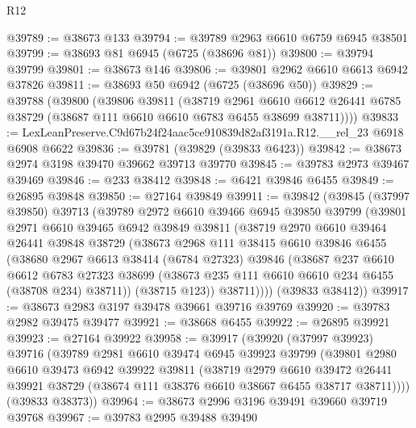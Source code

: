 \begin{lexlean}{R12}
\begin{coremodule}
@39789 := @38673 @133
@39794 := @39789 @2963 @6610 @6759 @6945 @38501
@39799 := @38693 @81 @6945 (@6725 (@38696 @81))
@39800 := @39794 @39799
@39801 := @38673 @146
@39806 := @39801 @2962 @6610 @6613 @6942 @37826
@39811 := @38693 @50 @6942 (@6725 (@38696 @50))
@39829 := @39788
    (@39800
      (@39806
        @39811
        (@38719
          @2961
          @6610
          @6612
          @26441
          @6785
          @38729
          (@38687 @111 @6610 @6610 @6783 @6455 @38699 @38711))))
@39833 := LexLeanPreserve.C9d67b24f24aac5ce910839d82af3191a.R12.__rel_23 @6918 @6908 @6622
@39836 := @39781 (@39829 (@39833 @6423))
@39842 := @38673 @2974 @3198 @39470 @39662 @39713 @39770
@39845 := @39783 @2973 @39467 @39469
@39846 := @233 @38412
@39848 := @6421 @39846 @6455
@39849 := @26895 @39848
@39850 := @27164 @39849
@39911 := @39842
    (@39845
      (@37997 @39850)
      @39713
      (@39789
        @2972
        @6610
        @39466
        @6945
        @39850
        @39799
        (@39801
          @2971
          @6610
          @39465
          @6942
          @39849
          @39811
          (@38719
            @2970
            @6610
            @39464
            @26441
            @39848
            @38729
            (@38673
              @2968
              @111
              @38415
              @6610
              @39846
              @6455
              (@38680
                @2967
                @6613
                @38414
                (@6784 @27323)
                @39846
                (@38687
                  @237
                  @6610
                  @6612
                  @6783
                  @27323
                  @38699
                  (@38673 @235 @111 @6610 @6610 @234 @6455 (@38708 @234) @38711))
                (@38715 @123))
              @38711))))
      (@39833 @38412))
@39917 := @38673 @2983 @3197 @39478 @39661 @39716 @39769
@39920 := @39783 @2982 @39475 @39477
@39921 := @38668 @6455
@39922 := @26895 @39921
@39923 := @27164 @39922
@39958 := @39917
    (@39920
      (@37997 @39923)
      @39716
      (@39789
        @2981
        @6610
        @39474
        @6945
        @39923
        @39799
        (@39801
          @2980
          @6610
          @39473
          @6942
          @39922
          @39811
          (@38719
            @2979
            @6610
            @39472
            @26441
            @39921
            @38729
            (@38674 @111 @38376 @6610 @38667 @6455 @38717 @38711))))
      (@39833 @38373))
@39964 := @38673 @2996 @3196 @39491 @39660 @39719 @39768
@39967 := @39783 @2995 @39488 @39490

\end{coremodule}
\end{lexlean}
